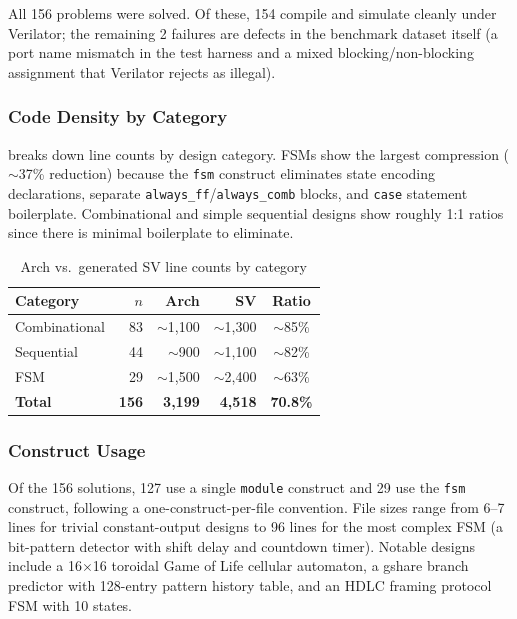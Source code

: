 \documentclass[11pt,twocolumn]{article}
\begin{document}
All 156 problems were solved. Of these, 154 compile and simulate cleanly under Verilator; the remaining 2 failures are defects in the benchmark dataset itself (a port name mismatch in the test harness and a mixed blocking/non-blocking assignment that Verilator rejects as illegal).

\subsubsection{Code Density by Category}

 breaks down line counts by design category. FSMs show the largest compression (${\sim}$37\% reduction) because the \texttt{fsm} construct eliminates state encoding declarations, separate \texttt{always\_ff}/\texttt{always\_comb} blocks, and \texttt{case} statement boilerplate. Combinational and simple sequential designs show roughly 1:1 ratios since there is minimal boilerplate to eliminate.

\begin{table}[t]
\centering
\caption{Arch vs.\ generated SV line counts by category}
\label{tab:density}
\small
\begin{tabular}{@{}lrrrc@{}}
\toprule
\textbf{Category} & \textbf{$n$} & \textbf{Arch} & \textbf{SV} & \textbf{Ratio} \\
\midrule
Combinational & 83 & ${\sim}$1,100 & ${\sim}$1,300 & ${\sim}$85\% \\
Sequential & 44 & ${\sim}$900 & ${\sim}$1,100 & ${\sim}$82\% \\
FSM & 29 & ${\sim}$1,500 & ${\sim}$2,400 & ${\sim}$63\% \\
\midrule
\textbf{Total} & \textbf{156} & \textbf{3,199} & \textbf{4,518} & \textbf{70.8\%} \\
\bottomrule
\end{tabular}
\end{table}

\subsubsection{Construct Usage}

Of the 156 solutions, 127 use a single \texttt{module} construct and 29 use the \texttt{fsm} construct, following a one-construct-per-file convention. File sizes range from 6--7 lines for trivial constant-output designs to 96 lines for the most complex FSM (a bit-pattern detector with shift delay and countdown timer). Notable designs include a 16$\times$16 toroidal Game of Life cellular automaton, a gshare branch predictor with 128-entry pattern history table, and an HDLC framing protocol FSM with 10 states.
\end{document}
